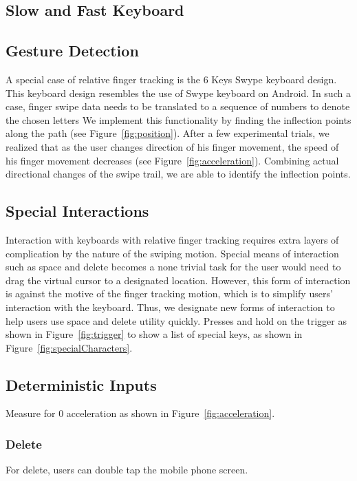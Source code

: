 \documentclass{sigchi}
\begin{document}
\subsection{Slow and Fast Keyboard}
\subsection{Gesture Detection}
A special case of relative finger tracking is the 6 Keys Swype keyboard design.
This keyboard design resembles the use of Swype keyboard on Android.
In such a case, finger swipe data needs to be translated to a sequence of numbers to denote the chosen letters
We implement this functionality by finding the inflection points along the path (see Figure~\ref{fig:position}).
After a few experimental trials, we realized that as the user changes direction of his finger movement, the speed of his finger movement decreases (see Figure~\ref{fig:acceleration}).
Combining actual directional changes of the swipe trail, we are able to identify the inflection points. 

\subsection{Special Interactions}



Interaction with keyboards with relative finger tracking requires extra layers of complication by the nature of the swiping motion.
Special means of interaction such as space and delete becomes a none trivial task for the user would need to drag the virtual cursor to a designated location.
However, this form of interaction is against the motive of the finger tracking motion, which is to simplify users' interaction with the keyboard.
Thus, we designate new forms of interaction to help users use space and delete utility quickly.
Presses and hold on the trigger as shown in Figure~\ref{fig:trigger} to show a list of special keys, as shown in Figure~\ref{fig:specialCharacters}.


\subsection{Deterministic Inputs}
Measure for 0 acceleration as shown in Figure~\ref{fig:acceleration}.

\subsubsection{Delete}
For delete, users can double tap the mobile phone screen.
\end{document}
